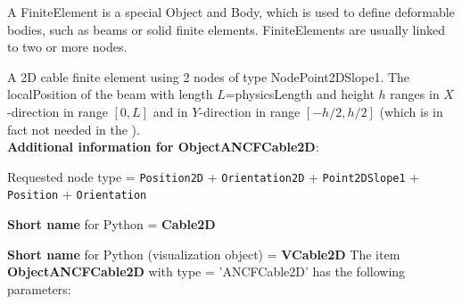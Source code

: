 \newpage
A FiniteElement is a special Object and Body, which is used to define deformable bodies, such as beams or solid finite elements. FiniteElements are usually linked to two or more nodes.

\label{sec:item:ObjectANCFCable2D}
A 2D cable finite element using 2 nodes of type NodePoint2DSlope1. The localPosition of the beam with length $L$=physicsLength and height $h$ ranges in $X$-direction in range $[0, L]$ and in $Y$-direction in range $[-h/2,h/2]$ (which is in fact not needed in the ).\vspace{12pt}
 \\{\bf Additional information for ObjectANCFCable2D}:
\bi
  \item Requested node type = \texttt{Position2D} + \texttt{Orientation2D} + \texttt{Point2DSlope1} + \texttt{Position} + \texttt{Orientation}
  \item {\bf Short name} for Python = {\bf Cable2D}  \item {\bf Short name} for Python (visualization object) = {\bf VCable2D}\ei
\vspace{12pt} \noindent The item {\bf ObjectANCFCable2D} with type = 'ANCFCable2D' has the following parameters:\vspace{-1cm}\\ 
